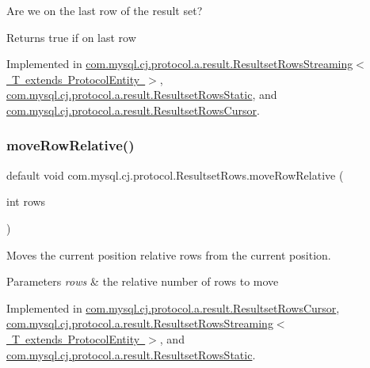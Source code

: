 Are we on the last row of the result set?

\begin{DoxyReturn}{Returns}
true if on last row 
\end{DoxyReturn}


Implemented in \mbox{\hyperlink{classcom_1_1mysql_1_1cj_1_1protocol_1_1a_1_1result_1_1_resultset_rows_streaming_abe926437ff8f266271a0e2403404dbc4}{com.\+mysql.\+cj.\+protocol.\+a.\+result.\+Resultset\+Rows\+Streaming$<$ T extends Protocol\+Entity $>$}}, \mbox{\hyperlink{classcom_1_1mysql_1_1cj_1_1protocol_1_1a_1_1result_1_1_resultset_rows_static_a2714d5e0fe10d3cb3b148a3fb2d6fec4}{com.\+mysql.\+cj.\+protocol.\+a.\+result.\+Resultset\+Rows\+Static}}, and \mbox{\hyperlink{classcom_1_1mysql_1_1cj_1_1protocol_1_1a_1_1result_1_1_resultset_rows_cursor_ae16f7cc758e2518a8cf1c6acfddeed10}{com.\+mysql.\+cj.\+protocol.\+a.\+result.\+Resultset\+Rows\+Cursor}}.

\mbox{\label{interfacecom_1_1mysql_1_1cj_1_1protocol_1_1_resultset_rows_a81d7635ad38c59a3160e3edc46327bac}} 
\subsubsection{\texorpdfstring{move\+Row\+Relative()}{moveRowRelative()}}
{\footnotesize\ttfamily default void com.\+mysql.\+cj.\+protocol.\+Resultset\+Rows.\+move\+Row\+Relative (\begin{DoxyParamCaption}\item[{int}]{rows }\end{DoxyParamCaption})}

Moves the current position relative \textquotesingle{}rows\textquotesingle{} from the current position.


\begin{DoxyParams}{Parameters}
{\em rows} & the relative number of rows to move \\
\hline
\end{DoxyParams}


Implemented in \mbox{\hyperlink{classcom_1_1mysql_1_1cj_1_1protocol_1_1a_1_1result_1_1_resultset_rows_cursor_af4a1433311e5089d29b554c81d0b006c}{com.\+mysql.\+cj.\+protocol.\+a.\+result.\+Resultset\+Rows\+Cursor}}, \mbox{\hyperlink{classcom_1_1mysql_1_1cj_1_1protocol_1_1a_1_1result_1_1_resultset_rows_streaming_a737e87ca2de64978c94ecd245f1b9cf4}{com.\+mysql.\+cj.\+protocol.\+a.\+result.\+Resultset\+Rows\+Streaming$<$ T extends Protocol\+Entity $>$}}, and \mbox{\hyperlink{classcom_1_1mysql_1_1cj_1_1protocol_1_1a_1_1result_1_1_resultset_rows_static_ac6527b7e8cbc7cb3ec0c67c854f145b7}{com.\+mysql.\+cj.\+protocol.\+a.\+result.\+Resultset\+Rows\+Static}}.

